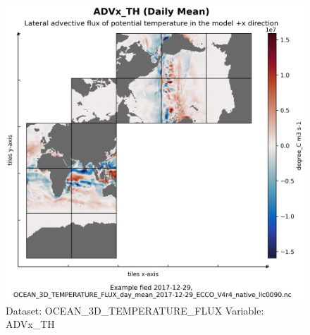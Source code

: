 \begin{figure}[H]
\centering
\includegraphics[scale=0.55]{../images/plots/native_plots/Ocean_Three-Dimensional_Potential_Temperature_Fluxes/ADVx_TH.png}
\caption{Dataset: OCEAN\_3D\_TEMPERATURE\_FLUX Variable: ADVx\_TH}
\label{tab:table-OCEAN_3D_TEMPERATURE_FLUX_ADVx_TH-Plot}
\end{figure}
\pagebreak
